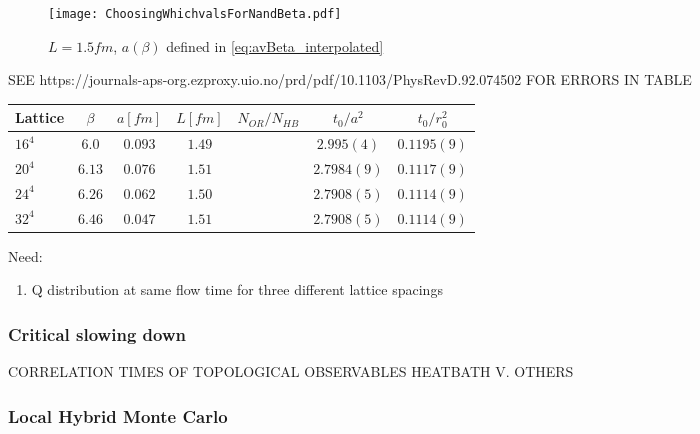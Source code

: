 \documentclass[a4paper,10pt]{article}
\begin{document}
\begin{figure}[H]
\centering
\texttt{[image: ChoosingWhichvalsForNandBeta.pdf]}
\caption[]{$L=1.5fm$, $a(\beta)$ defined in \eqref{eq:avBeta_interpolated} }\label{fig:as}
\end{figure}


SEE 
https://journals-aps-org.ezproxy.uio.no/prd/pdf/10.1103/PhysRevD.92.074502
FOR ERRORS IN TABLE
\begin{tabular}{lcccccc}
\hline \hline Lattice & $\beta$ & $a[fm]$ & $L[fm]$ & $N_{OR}/N_{HB}$&$t_{0} / a^{2}$ & $t_{0} / r_{0}^{2}$\\
\hline$16^4$ & $6.0$ & $0.093$ & $1.49$ & &$2.995(4)$  & $0.1195(9)$ \\
	  $20^4$ & $6.13$& $0.076$ & $1.51$ & &$2.7984(9)$ & $0.1117(9)$ \\
	  $24^4$ & $6.26$& $0.062$ & $1.50$ & &$2.7908(5)$ & $0.1114(9)$ \\
	  $32^4$ & $6.46$& $0.047$ & $1.51$ & &$2.7908(5)$ & $0.1114(9)$
\end{tabular}

Need:
\begin{enumerate}
\item Q distribution at same flow time for three different lattice spacings
\end{enumerate}






\subsubsection{Critical slowing down}
CORRELATION TIMES OF TOPOLOGICAL OBSERVABLES HEATBATH V. OTHERS
\subsubsection{Local Hybrid Monte Carlo}
\end{document}

